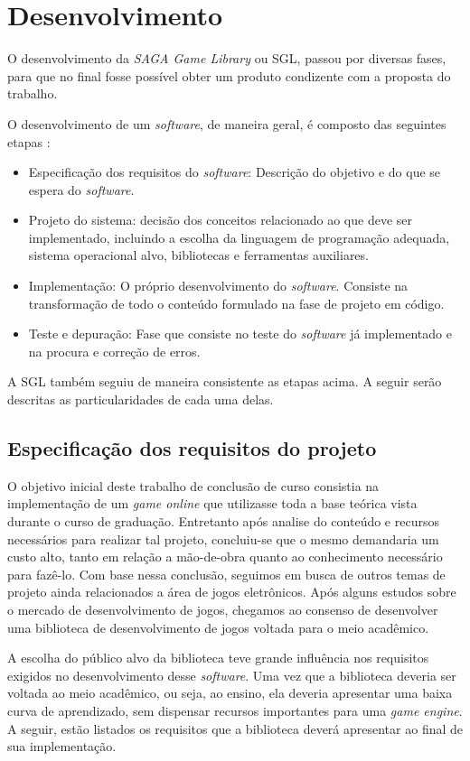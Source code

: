 \chapter{Desenvolvimento}
\label{cap:desenvolvimento}
%
%
O desenvolvimento da \textit{SAGA Game Library} ou SGL, passou por diversas fases, para que no final fosse possível obter um produto condizente com a proposta do trabalho.
\par 
O desenvolvimento de um \textit{software}, de maneira geral, é composto das seguintes etapas \cite{HeadFirst}:
%
\begin{itemize}
\item Especificação dos requisitos do \textit{software}: Descrição do objetivo e do que se espera do \textit{software}.
\item Projeto do sistema: decisão dos conceitos relacionado ao que deve ser implementado, incluindo a escolha da linguagem de programação adequada, sistema operacional alvo, bibliotecas e ferramentas auxiliares.
\item Implementação: O próprio desenvolvimento do \textit{software}. Consiste na transformação de todo o conteúdo formulado na fase de projeto em código.
\item Teste e depuração: Fase que consiste no teste do \textit{software} já implementado e na procura e correção de erros.
\end{itemize}
%
\par 
A SGL também seguiu de maneira consistente as etapas acima. A seguir serão descritas as particularidades de cada uma delas.
%
%
%
%
\section{Especificação dos requisitos do projeto}
%
O objetivo inicial deste trabalho de conclusão de curso consistia na implementação de um \textit{game online} que utilizasse toda a base teórica vista durante o curso de graduação. Entretanto após analise do conteúdo e recursos necessários para realizar tal projeto, concluiu-se que o mesmo demandaria um custo alto, tanto em relação a mão-de-obra quanto ao conhecimento necessário para fazê-lo. Com base nessa conclusão, seguimos em busca de outros temas de projeto ainda relacionados a área de jogos eletrônicos. Após alguns estudos sobre o mercado de desenvolvimento de jogos, chegamos ao consenso de desenvolver uma biblioteca de desenvolvimento de jogos voltada para o meio acadêmico.
\par 
A escolha do público alvo da biblioteca teve grande influência nos requisitos exigidos no desenvolvimento desse \textit{software}. Uma vez que a biblioteca deveria ser voltada ao meio acadêmico, ou seja, ao ensino, ela deveria apresentar uma baixa curva de aprendizado, sem dispensar recursos importantes para uma \textit{game engine}. A seguir, estão listados os requisitos que a biblioteca deverá apresentar ao final de sua implementação.
%

